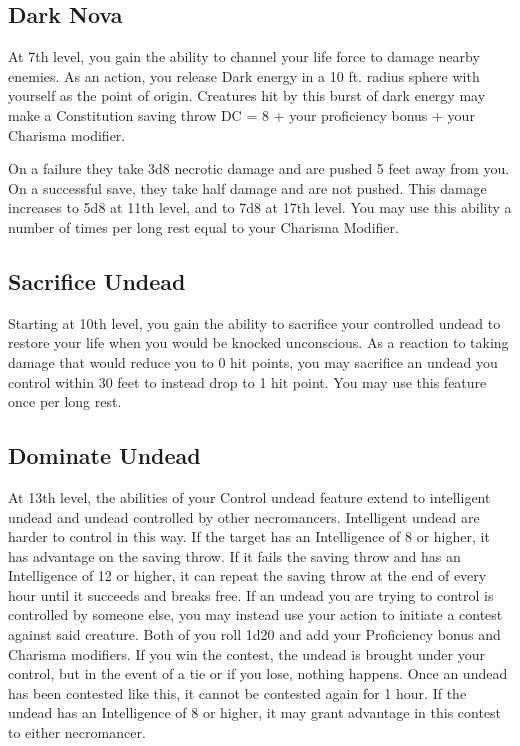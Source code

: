 \subsection{Dark Nova}
At 7th level, you gain the ability to channel your life force to damage nearby enemies. As an action, you release Dark energy in a 10 ft. radius sphere with yourself as the point of origin. Creatures hit by this burst of dark energy may make a Constitution saving throw DC = 8 + your proficiency bonus + your Charisma modifier. 

On a failure they take 3d8 necrotic damage and are pushed 5 feet away from you. On a successful save, they take half damage and are not pushed. This damage increases to 5d8 at 11th level, and to 7d8 at 17th level. You may use this ability a number of times per long rest equal to your Charisma Modifier.

\subsection{Sacrifice Undead}
Starting at 10th level, you gain the ability to sacrifice your controlled undead to restore your life when you would be knocked unconscious. As a reaction to taking damage that would reduce you to 0 hit points, you may sacrifice an undead you control within 30 feet to instead drop to 1 hit point. You may use this feature once per long rest.

\subsection{Dominate Undead}
At 13th level, the abilities of your Control undead feature extend to intelligent undead and undead controlled by other necromancers. Intelligent undead are harder to control in this way. If the target has an Intelligence of 8 or higher, it has advantage on the saving throw. If it fails the saving throw and has an Intelligence of 12 or higher, it can repeat the saving throw at the end of every hour until it succeeds and breaks free.
If an undead you are trying to control is controlled by someone else, you may instead use your action to initiate a contest against said creature. Both of you roll 1d20 and add your Proficiency bonus and Charisma modifiers. If you win the contest, the undead is brought under your control, but in the event of a tie or if you lose, nothing happens. Once an undead has been contested like this, it cannot be contested again for 1 hour. If the undead has an Intelligence of 8 or higher, it may grant advantage in this contest to either necromancer.

